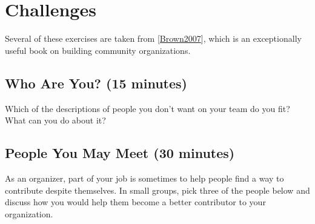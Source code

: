 \documentclass[10pt,statementpaper]{memoir}
\begin{document}
\section{Challenges}\label{challenges-10}

Several of these exercises are taken from
{[}\href{biblio.html\#brown-bpco}{Brown2007}{]}, which is an
exceptionally useful book on building community organizations.

\subsection{Who Are You? (15 minutes)}\label{who-are-you-15-minutes}

Which of the descriptions of people you don't want on your team do you
fit? What can you do about it?

\subsection{People You May Meet (30
minutes)}\label{people-you-may-meet-30-minutes}

As an organizer, part of your job is sometimes to help people find a way
to contribute despite themselves. In small groups, pick three of the
people below and discuss how you would help them become a better
contributor to your organization.
\end{document}
